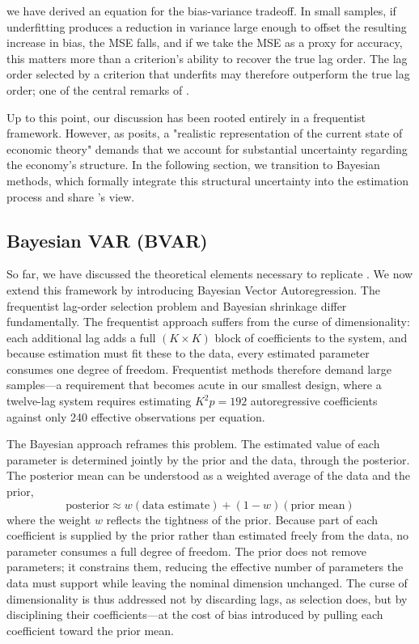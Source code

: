 \documentclass[12pt, a4paper]{article}
\begin{document}
we have derived an equation for the bias-variance tradeoff. In small samples, if underfitting produces a reduction in variance large enough to offset the resulting increase in bias, the MSE falls, and if we take the MSE as a proxy for accuracy, this matters more than a criterion's ability to recover the true lag order. The lag order selected by a criterion that underfits may therefore outperform the true lag order; one of the central remarks of \citet{ivanovPractitionersGuideLag2005}.

Up to this point, our discussion has been rooted entirely in a frequentist framework. However, as \citet{littermanForecastingBayesianVector1986} posits, a "realistic representation of the current state of economic theory" demands that we account for substantial uncertainty regarding the economy's structure. In the following section, we transition to Bayesian methods, which formally integrate this structural uncertainty into the estimation process and share \citet{littermanForecastingBayesianVector1986}'s view.

\subsection{Bayesian VAR (BVAR)}
\label{sec:BVAR}

So far, we have discussed the theoretical elements necessary to replicate \citet{ivanovPractitionersGuideLag2005}. We now extend this framework by introducing Bayesian Vector Autoregression. The frequentist lag-order selection problem and Bayesian shrinkage differ fundamentally. The frequentist approach suffers from the curse of dimensionality: each additional lag adds a full $(K \times K)$ block of coefficients to the system, and because estimation must fit these to the data, every estimated parameter consumes one degree of freedom. Frequentist methods therefore demand large samples—a requirement that becomes acute in our smallest design, where a twelve-lag system requires estimating $K^2p = 192$ autoregressive coefficients against only 240 effective observations per equation.

The Bayesian approach reframes this problem. The estimated value of each parameter is determined jointly by the prior and the data, through the posterior. The posterior mean can be understood as a weighted average of the data and the prior,
\begin{equation} \label{eq:posterior_weight}
\text{posterior} \approx w(\text{data estimate}) + (1 - w)(\text{prior mean})
\end{equation}
where the weight $w$ reflects the tightness of the prior. Because part of each coefficient is supplied by the prior rather than estimated freely from the data, no parameter consumes a full degree of freedom. The prior does not remove parameters; it constrains them, reducing the effective number of parameters the data must support while leaving the nominal dimension unchanged. The curse of dimensionality is thus addressed not by discarding lags, as selection does, but by disciplining their coefficients—at the cost of bias introduced by pulling each coefficient toward the prior mean.
\end{document}
